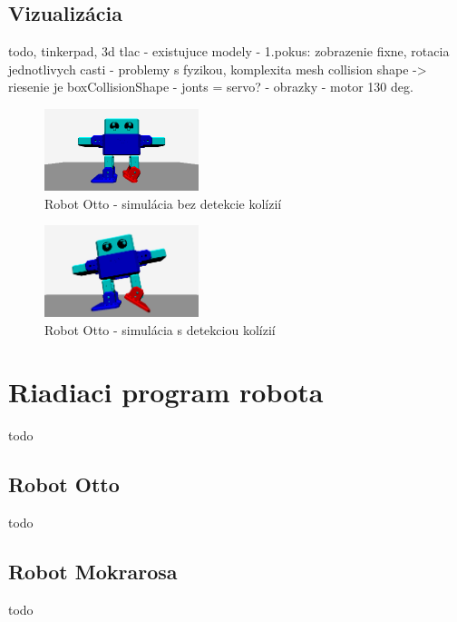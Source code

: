 \subsection{Vizualizácia}
todo, tinkerpad, 3d tlac - existujuce modely
- 1.pokus: zobrazenie fixne, rotacia jednotlivych casti
- problemy s fyzikou, komplexita mesh collision shape -> riesenie je boxCollisionShape
- jonts = servo?
- obrazky - motor 130 deg.

\begin{figure}
\centerline{\includegraphics[width=0.4\textwidth]{images/otto-without-collision}}
\caption[Robot Otto - simulácia bez detekcie kolízií]{Robot Otto - simulácia bez detekcie kolízií}
\label{obr:otto-without-collision}
\end{figure}

\begin{figure}
\centerline{\includegraphics[width=0.4\textwidth]{images/otto-with-collision}}
\caption[Robot Otto - simulácia s detekciou kolízií]{Robot Otto - simulácia s detekciou kolízií}
\label{obr:otto-with-collision}
\end{figure}

\section{Riadiaci program robota}
todo

\subsection{Robot Otto}
todo

\subsection{Robot Mokrarosa}
todo
